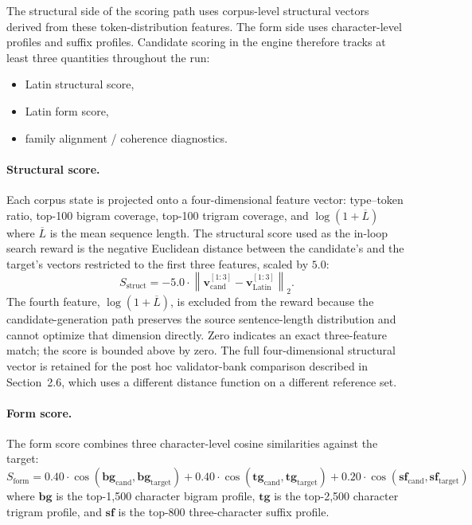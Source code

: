 \documentclass[11pt]{article}
\begin{document}
The structural side of the scoring path uses corpus-level structural vectors
derived from these token-distribution features. The form side uses
character-level profiles and suffix profiles. Candidate scoring in the engine
therefore tracks at least three quantities throughout the run:

\begin{itemize}
    \item Latin structural score,
    \item Latin form score,
    \item family alignment / coherence diagnostics.
\end{itemize}

\paragraph{Structural score.}
Each corpus state is projected onto a four-dimensional feature vector:
type--token ratio, top-100 bigram coverage, top-100 trigram coverage, and
$\log(1 + \overline{L})$ where $\overline{L}$ is the mean sequence length.
The structural score used as the in-loop search reward is the negative
Euclidean distance between the candidate's and the target's vectors
restricted to the first three features, scaled by $5.0$:
%
\begin{equation}
\label{eq:struct-score}
S_{\mathrm{struct}}
  = -5.0 \cdot \left\| \mathbf{v}_{\mathrm{cand}}^{[1:3]}
                - \mathbf{v}_{\mathrm{Latin}}^{[1:3]} \right\|_2.
\end{equation}
%
The fourth feature, $\log(1 + \overline{L})$, is excluded from the reward
because the candidate-generation path preserves the source sentence-length
distribution and cannot optimize that dimension directly. Zero indicates
an exact three-feature match; the score is bounded above by zero. The
full four-dimensional structural vector is retained for the post hoc
validator-bank comparison described in Section~2.6, which uses a
different distance function on a different reference set.

\paragraph{Form score.}
The form score combines three character-level cosine similarities against the
target:
\[
  S_{\mathrm{form}} =
    0.40 \cdot \cos(\mathbf{bg}_{\mathrm{cand}},\mathbf{bg}_{\mathrm{target}})
  + 0.40 \cdot \cos(\mathbf{tg}_{\mathrm{cand}},\mathbf{tg}_{\mathrm{target}})
  + 0.20 \cdot \cos(\mathbf{sf}_{\mathrm{cand}},\mathbf{sf}_{\mathrm{target}})
\]
where $\mathbf{bg}$ is the top-1{,}500 character bigram profile,
$\mathbf{tg}$ is the top-2{,}500 character trigram profile, and
$\mathbf{sf}$ is the top-800 three-character suffix profile.
\end{document}
